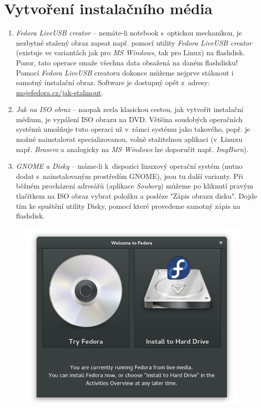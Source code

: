 \section*{Vytvoření instalačního média}
\begin{enumerate}

\item\emph{Fedora LiveUSB creator} -- nemáte-li notebook s~optickou mechanikou, je nezbytné stažený obraz zapsat např. pomocí utility \emph{Fedora LiveUSB creator} (existuje ve variantách jak pro \emph{MS Windows}, tak pro Linux) na flashdisk. Pozor, tato operace smaže všechna data obsažená na daném flashdisku! Pomocí \emph{Fedora LiveUSB} creatoru dokonce můžeme nejprve stáhnout i samotný instalační obraz. Software je dostupný opět z~adresy: \url{mojefedora.cz/jak-stahnout}.

\item\emph{Jak na ISO obraz} -- naopak zcela klasickou cestou, jak vytvořit instalační médium, je vypálení ISO obrazu na DVD. Většina soudobých operačních systémů umožňuje tuto operaci už v~rámci systému jako takového, popř. je možné nainstalovat specializovanou, volně stažitelnou aplikaci (v~Linuxu např. \emph{Brasero} a analogicky na \emph{MS Windows} lze doporučit např. \emph{ImgBurn}).

\item\emph{GNOME a Disky} -- máme-li k~dispozici linuxový operační systém (nutno dodat s~nainstalovaným prostředím GNOME), jsou tu další varianty. Při běžném procházení adresářů (aplikace \emph{Soubory}) můžeme po kliknutí pravým tlačítkem na ISO obraz vybrat položku  a posléze "Zápis obrazu disku". Dojde tím ke spuštění utility Disky, pomocí které provedeme samotný zápis na flashdisk.
\end{enumerate}

\begin{figure}[t]
\begin{center}
\includegraphics[width=.75\textwidth]{img/instalator-a}
 \label{fig:instalator-a}
\end{center}
\end{figure}

